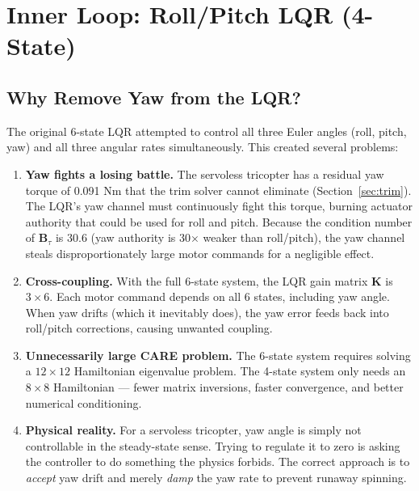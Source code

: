 \documentclass[12pt, a4paper]{article}
\newcommand{\bK}{\bm{K}}
\newcommand{\bB}{\bm{B}}
\begin{document}
\section{Inner Loop: Roll/Pitch LQR (4-State)}
\label{sec:lqr}

\subsection{Why Remove Yaw from the LQR?}

The original 6-state LQR attempted to control all three Euler angles (roll, pitch, yaw) and all three angular rates simultaneously.  This created several problems:

\begin{enumerate}
    \item \textbf{Yaw fights a losing battle.}  The servoless tricopter has a residual yaw torque of 0.091 Nm that the trim solver cannot eliminate (Section~\ref{sec:trim}).  The LQR's yaw channel must continuously fight this torque, burning actuator authority that could be used for roll and pitch.  Because the condition number of $\bB_\tau$ is 30.6 (yaw authority is 30$\times$ weaker than roll/pitch), the yaw channel steals disproportionately large motor commands for a negligible effect.

    \item \textbf{Cross-coupling.}  With the full 6-state system, the LQR gain matrix $\bK$ is $3 \times 6$.  Each motor command depends on all 6 states, including yaw angle.  When yaw drifts (which it inevitably does), the yaw error feeds back into roll/pitch corrections, causing unwanted coupling.

    \item \textbf{Unnecessarily large CARE problem.}  The 6-state system requires solving a $12 \times 12$ Hamiltonian eigenvalue problem.  The 4-state system only needs an $8 \times 8$ Hamiltonian --- fewer matrix inversions, faster convergence, and better numerical conditioning.

    \item \textbf{Physical reality.}  For a servoless tricopter, yaw angle is simply not controllable in the steady-state sense.  Trying to regulate it to zero is asking the controller to do something the physics forbids.  The correct approach is to \emph{accept} yaw drift and merely \emph{damp} the yaw rate to prevent runaway spinning.
\end{enumerate}
\end{document}
